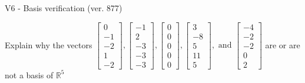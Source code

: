 \begin{exercise}
  \begin{exerciseTitle}V6 - Basis verification (ver. 877)\end{exerciseTitle}
  \begin{exerciseStatement}
    Explain why the vectors \(\left[\begin{array}{r}
0 \\
-1 \\
-2 \\
1 \\
-2
\end{array}\right] , \left[\begin{array}{r}
-1 \\
2 \\
-3 \\
-3 \\
-3
\end{array}\right] , \left[\begin{array}{r}
0 \\
0 \\
0 \\
0 \\
0
\end{array}\right] , \left[\begin{array}{r}
3 \\
-8 \\
5 \\
11 \\
5
\end{array}\right] , \text{ and } \left[\begin{array}{r}
-4 \\
-2 \\
-2 \\
0 \\
2
\end{array}\right]\) are or are not a basis of \(\mathbb{R}^5\)	



\end{exerciseStatement}
\end{exercise}
